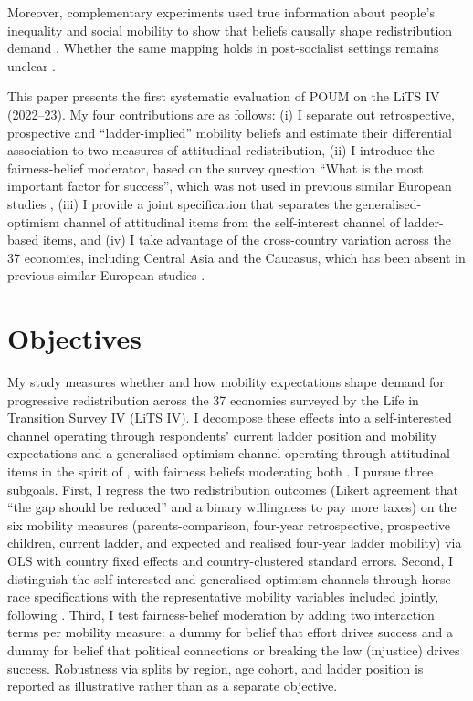 \documentclass[11pt,a4paper]{article}
\begin{document}
Moreover, complementary experiments used true information about people's inequality and
social mobility to show that beliefs causally shape redistribution demand
\citep{kuziemko2015elastic, karadja2017richer, roth2018expected, stantcheva2021perceptions}.
Whether the same mapping holds in post-socialist settings remains unclear
\citep{grosfeld2010comparing}.

This paper presents the first systematic evaluation of POUM on the LiTS IV (2022--23).
My four contributions are as follows: (i) I separate out retrospective, prospective and
``ladder-implied'' mobility beliefs and estimate their differential association to two
measures of attitudinal redistribution, (ii) I introduce the fairness-belief moderator,
based on the survey question ``What is the most important factor for success'', which
was not used in previous similar European studies \citep{alesina2005fairness,
alesina2018intergenerational}, (iii) I provide a joint specification that separates the
generalised-optimism channel of attitudinal items from the self-interest channel of
ladder-based items, and (iv) I take advantage of the cross-country variation across the
37 economies, including Central Asia and the Caucasus, which has been absent in previous
similar European studies \citep{jaime2019social}.


\section{Objectives}

My study measures whether and how mobility expectations shape demand for progressive
redistribution across the 37 economies surveyed by the Life in Transition Survey IV
(LiTS IV). I decompose these effects into a self-interested channel operating through
respondents' current ladder position and mobility expectations \citep{benabou2001social}
and a generalised-optimism channel operating through attitudinal items in the spirit
of \citet{hirschman1973changing, benabou2006belief, alesina2018intergenerational},
with fairness beliefs moderating both \citep{alesina2005fairness}. I pursue three
subgoals. First, I regress the two redistribution outcomes (Likert agreement that
``the gap should be reduced'' and a binary willingness to pay more taxes) on the six
mobility measures (parents-comparison, four-year retrospective, prospective children,
current ladder, and expected and realised four-year ladder mobility) via OLS with
country fixed effects and country-clustered standard errors. Second, I distinguish the
self-interested and generalised-optimism channels through horse-race specifications
with the representative mobility variables included jointly, following
\citet{alesina2018intergenerational, stantcheva2021perceptions}. Third, I test
fairness-belief moderation by adding two interaction terms per mobility measure: a
dummy for belief that effort drives success and a dummy for belief that political
connections or breaking the law (injustice) drives success. Robustness via splits by
region, age cohort, and ladder position is reported as illustrative rather than as a
separate objective.
\end{document}
